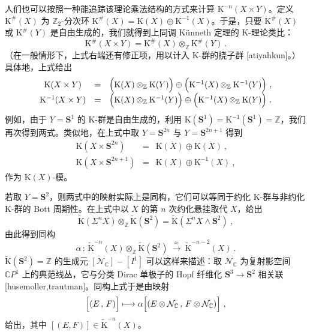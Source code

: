 \documentclass[11pt,a4paper]{ctexart}
\begin{document}
人们也可以按照一种能追踪该理论乘法结构的方式来计算 \({\mathrm K}^{-n}(X\times Y)\)。定义 \({\mathrm K}^\#(X)\) 为 \({\mathbb{Z}}_2\)-分次环 \({\mathrm K}^\#(X)={\mathrm K}(X)\oplus
{\mathrm K}^{-1}(X)\)。于是，只要 \({\mathrm K}^\#(X)\) 或 \({\mathrm K}^\#(Y)\) 是自由生成的，我们就得到上同调 Künneth 定理的 K-理论类比： \[{\mathrm K}^\#(X\times Y)={\mathrm K}^\#(X)\otimes_{{\mathbb{Z}}} {\mathrm K}^\#(Y)\ .\] （在一般情形下，上式右端还有修正项，用以计入 K-群的挠子群 [atiyahkun]。）具体地，上式给出 \[\begin{matrix}
{\mathrm K}(X\times Y)&=&\Bigl({\mathrm K}(X)\otimes_{\mathbb{Z}}{\mathrm K}(Y)\Bigr)
\oplus\Bigl({\mathrm K}^{-1}(X)\otimes_{\mathbb{Z}}{\mathrm K}^{-1}(Y)\Bigr)\ ,\\
{\mathrm K}^{-1}(X\times Y)&=&\Bigl({\mathrm K}(X)\otimes_{\mathbb{Z}}{\mathrm K}^{-1}(Y)\Bigr)
\oplus\Bigl({\mathrm K}^{-1}(X)\otimes_{\mathbb{Z}}{\mathrm K}(Y)\Bigr)\ .
\end{matrix}\] 例如，由于 \(Y={\mathbf S}^1\) 的 K-群是自由生成的，利用 \({\mathrm K}({\mathbf S}^1)={\mathrm K}^{-1}({\mathbf S}^1)={\mathbb{Z}}\)，我们再次得到两式。类似地，在上式中取 \(Y={\mathbf S}^{2n}\) 与 \(Y={\mathbf S}^{2n+1}\) 得到 \[\begin{matrix}
{\mathrm K}(X\times {\mathbf S}^{2n})&=& {\mathrm K}(X)\oplus {\mathrm K}(X)\ ,\\
{\mathrm K}(X\times {\mathbf S}^{2n+1})&=&{\mathrm K}(X)\oplus{\mathrm K}^{-1}(X)\ ,
\end{matrix}\] 作为 \({\mathrm K}(X)\)-模。

若取 \(Y={\mathbf S}^2\)，则两式中的映射实际上是同构，它们可以等同于约化 K-群与非约化 K-群的 Bott 周期性。在上式中以 \(X\) 的第 \(n\) 次约化悬挂取代 \(X\)，给出 \[\widetilde{{\mathrm K}}(\Sigma^nX)\otimes_{\mathbb{Z}}\widetilde{{\mathrm K}}({\mathbf S}^2)
=\widetilde{{\mathrm K}}(\Sigma^nX\wedge{\mathbf S}^2)\ ,\] 由此得到同构 \[\alpha\,:\,\widetilde{{\mathrm K}}^{-n}(X)\otimes_{\mathbb{Z}}\widetilde{{\mathrm K}}({\mathbf S}^2)~
\stackrel{\approx}{\longrightarrow}~\widetilde{{\mathrm K}}^{-n-2}(X)\ .\] \(\widetilde{{\mathrm K}}({\mathbf S}^2)={\mathbb{Z}}\) 的生成元 \([{\mathcal N}_{\mathbb{C}}]-[I^1]\) 可以这样来描述：取 \({\mathcal N}_{\mathbb{C}}\) 为复射影空间 \({\mathbb{C}} P^1\) 上的典范线丛，它与分类 Dirac 单极子的 Hopf 纤维化 \({\mathbf S}^3\to
{\mathbf S}^2\) 相关联 [husemoller,trautman]。同构上式于是由映射 \[\Bigl[(E\,,\,F)\Bigr]\longmapsto \alpha\Bigl[(E\otimes {\mathcal N}_{\mathbb{C}}\,,\,
F\otimes {\mathcal N}_{\mathbb{C}})\Bigr]\ ,\] 给出，其中 \([(E,F)]\in \widetilde{{\mathrm K}}^{-n}(X)\)。
\end{document}
